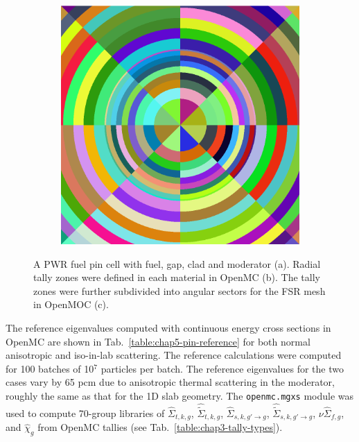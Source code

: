 \begin{figure}[H]
\begin{subfigure}{.32\textwidth}
  \caption{}
  \label{fig:chap5-pin-b}
\end{subfigure}
\begin{subfigure}{.32\textwidth}
  \centering
  \includegraphics[width=0.9\linewidth]{figures/biases/pin-cell/pin-cell-8x8}
  \caption{}
  \label{fig:chap5-pin-c}
\end{subfigure}
\caption[Pin cell materials and geometry]{A PWR fuel pin cell with fuel, gap, clad and moderator (a). Radial tally zones were defined in each material in OpenMC (b). The tally zones were further subdivided into angular sectors for the \ac{FSR} mesh in OpenMOC (c).}
\label{fig:chap5-pin-cell}
\end{figure}

The reference eigenvalues computed with continuous energy cross sections in OpenMC are shown in Tab.~\ref{table:chap5-pin-reference} for both normal anisotropic and iso-in-lab scattering. The reference calculations were computed for 100 batches of 10$^{7}$ particles per batch. The reference eigenvalues for the two cases vary by 65 \ac{pcm} due to anisotropic thermal scattering in the moderator, roughly the same as that for the 1D slab geometry. The \texttt{openmc.mgxs} module was used to compute 70-group libraries of $\hat{\Sigma}_{t,k,g}$, $\hat{\tilde{\Sigma}}_{t,k,g}$, $\hat{\Sigma}_{s,k,g'\rightarrow g}$, $\hat{\tilde{\Sigma}}_{s,k,g'\rightarrow g}$, $\nu\hat{\Sigma}_{f,g}$, and $\hat{\chi}_{g}$ from OpenMC tallies (see Tab.~\ref{table:chap3-tally-types}). 

